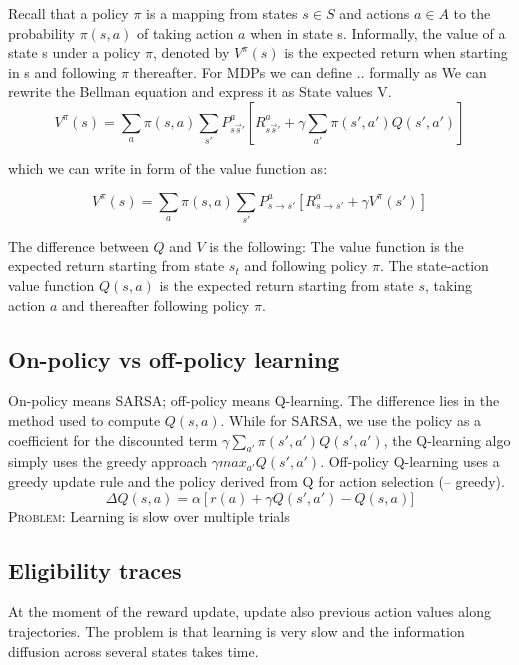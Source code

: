 \documentclass[11pt]{article}
\begin{document}
Recall that a policy $\pi$ is a mapping from states $s \in S$ and actions $a \in A$ to the probability $\pi(s,a)$ of taking action $a$ when in state s. Informally, the value of a state s under a
policy $\pi$, denoted by $V^\pi(s)$ is the expected return when starting in s and following $\pi$ thereafter. For MDPs we can define .. formally as 
We can rewrite the Bellman equation and express it as State values V.
\[
	V^{\pi}(s) = \sum_a \pi(s,a) \sum_{s'} P^a_{s \overrightarrow s'} [R^a_{s \overrightarrow s'} + \gamma \sum_{a'}\pi(s',a')Q(s',a')]
\]

which we can write in form of the value function as:

\[
	V^{\pi}(s) = \sum_a \pi(s,a) \sum_{s'} P_{s \rightarrow s'}^a[R_{s \rightarrow s'}^a + \gamma V^{\pi}(s')]
\]

The difference between $Q$ and $V$ is the following: The value function is the expected return starting from state $s_t$ and following policy $\pi$. The state-action value function $Q(s,a)$ is the expected return starting from state $s$, taking action $a$ and thereafter following policy $\pi$.

\subsection{On-policy vs off-policy learning}
On-policy means SARSA; off-policy means Q-learning. The difference lies in the method used to compute $Q(s,a)$. While for SARSA, we use the policy as a coefficient for the discounted term $\gamma \sum_{a'} \pi(s',a')Q(s',a')$, the Q-learning algo simply uses the greedy approach $\gamma max_{a'}Q(s',a')$. Off-policy Q-learning uses a greedy update rule and the policy derived from Q for action selection (\eta -- greedy).
\[
\Delta Q(s,a)=\alpha\left[r(a)+\gamma Q(s',a')-Q(s,a)]
\]
\textsc{Problem}: Learning is slow over multiple trials

\subsection{Eligibility traces}
At the moment of the reward update, update also previous action values along trajectories. The problem is that learning is very slow and the information diffusion across several states takes time.
\end{document}
